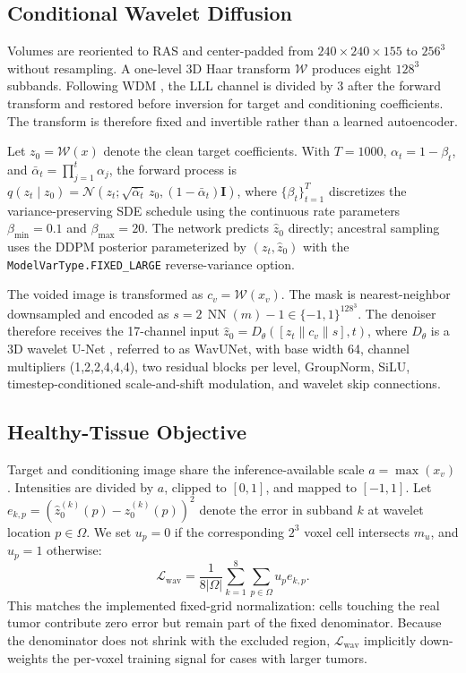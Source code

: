 \documentclass[runningheads]{llncs}
\begin{document}
\subsection{Conditional Wavelet Diffusion} \label{sec:method:wavelet}

Volumes are reoriented to RAS and center-padded from $240\times240\times155$ to $256^3$ without resampling. A one-level 3D Haar transform $\mathcal W$ produces eight $128^3$ subbands. Following WDM \cite{friedrich2024wdm}, the LLL channel is divided by 3 after the forward transform and restored before inversion for target and conditioning coefficients. The transform is therefore fixed and invertible rather than a learned autoencoder.

Let $z_0=\mathcal W(x)$ denote the clean target coefficients. With $T=1000$, $\alpha_t=1-\beta_t$, and $\bar\alpha_t=\prod_{j=1}^{t}\alpha_j$, the forward process is $q(z_t\mid z_0)=\mathcal N\!\left(z_t;\sqrt{\bar\alpha_t}\,z_0,(1-\bar\alpha_t)\mathbf I\right)$, where $\{\beta_t\}_{t=1}^{T}$ discretizes the variance-preserving SDE schedule \cite{song2021scoresde} using the continuous rate parameters $\beta_{\min}=0.1$ and $\beta_{\max}=20$. The network predicts $\hat z_0$ directly; ancestral sampling uses the DDPM posterior parameterized by $(z_t,\hat z_0)$ with the \texttt{ModelVarType.FIXED\_LARGE} reverse-variance option.

The voided image is transformed as $c_v=\mathcal W(x_v)$. The mask is nearest-neighbor downsampled and encoded as $s=2\,\operatorname{NN}(m)-1\in\{-1,1\}^{128^3}$. The denoiser therefore receives the 17-channel input $\hat z_0=D_\theta([z_t\|c_v\|s],t)$, where $D_\theta$ is a 3D wavelet U-Net \cite{ronneberger2015unet,winther2025rare,friedrich2024wdm}, referred to as WavUNet, with base width 64, channel multipliers (1,2,2,4,4,4), two residual blocks per level, GroupNorm, SiLU, timestep-conditioned scale-and-shift modulation, and wavelet skip connections.


\subsection{Healthy-Tissue Objective} \label{sec:method:objective}

Target and conditioning image share the inference-available scale $a=\max(x_v)$. Intensities are divided by $a$, clipped to $[0,1]$, and mapped to $[-1,1]$. Let $e_{k,p}=(\hat z_0^{(k)}(p)-z_0^{(k)}(p))^2$ denote the error in subband $k$ at wavelet location $p\in\Omega$. We set $u_p=0$ if the corresponding $2^3$ voxel cell intersects $m_u$, and $u_p=1$ otherwise:
\begin{equation}
\mathcal L_{\mathrm{wav}}=
\frac{1}{8|\Omega|}
\sum_{k=1}^{8}\sum_{p\in\Omega}u_p e_{k,p}.
\label{eq:wavelet-loss}
\end{equation}
This matches the implemented fixed-grid normalization: cells touching the real tumor contribute zero error but remain part of the fixed denominator. Because the denominator does not shrink with the excluded region, $\mathcal L_{\mathrm{wav}}$ implicitly down-weights the per-voxel training signal for cases with larger tumors.
\end{document}
